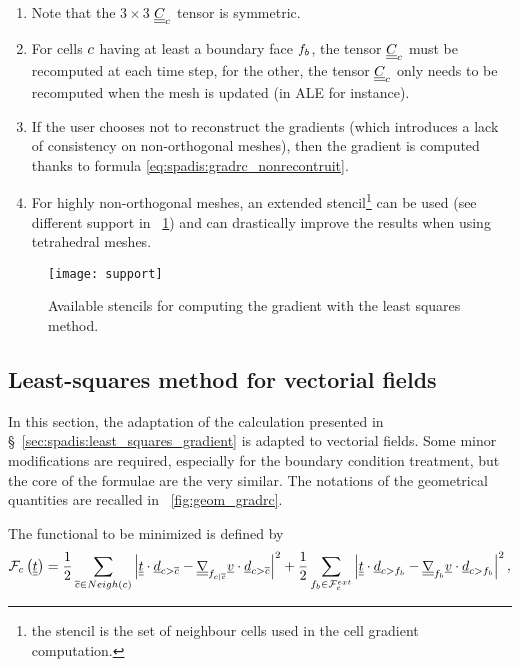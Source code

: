 \begin{remark}
\begin{enumerate}[ label=\roman{*}/, ref=(\roman{*})]
\item Note that the $3\times3$ $\underline{\underline{C}}_{c}$ tensor is symmetric.
\item For cells $c$ having at least a boundary face ${{f}_{b}}$, the tensor $\underline{\underline{C}}_{c}$ must be recomputed at each time step,
for the other, the tensor $\underline{\underline{C}}_{c}$ only needs to be recomputed when the mesh is updated (in ALE for instance).
\item If the user chooses not to reconstruct the gradients (which introduces a lack of consistency on non-orthogonal meshes),
then the gradient is computed thanks to formula \eqref{eq:spadis:gradrc_nonrecontruit}.
\item For highly non-orthogonal meshes, an extended stencil\footnote{
the stencil is the set of neighbour cells used in the cell gradient computation.
} can be used (see different support in \figurename~\ref{fig:spadis:gradmc_support}) and can drastically improve the results when using tetrahedral meshes.
\end{enumerate}
\end{remark}

\begin{figure}[!htp]
\centerline{\texttt{[image: support]}}
\caption{Available stencils for computing the gradient with the least squares method.\label{fig:spadis:gradmc_support}}
\end{figure}


\subsection{Least-squares method for vectorial fields}\label{sec:spadis:least_squares_gradient_vectors}
%
In this section, the adaptation of the calculation presented in \S~\ref{sec:spadis:least_squares_gradient} is adapted to
vectorial fields. Some minor modifications are required, especially for the boundary condition treatment, but the core of the
formulae are the very similar. The notations of the geometrical quantities are recalled in \figurename~\ref{fig:geom_gradrc}.

The functional to be minimized is defined by
%
\begin{equation}\label{eq:spadis:gradmv_function}
\mathcal{F}_c
\left( \underline{\underline{t}} \right) =
\dfrac{1}{2}\sum\limits_{{\overline{c}} \in Neigh\left(c\right)  }
\left| 
 \underline{\underline{t}}   \cdot \underline{d}_{{c > {\overline{c}}}}  -  \underline{\underline{{\nabla}}}_{{{f}_{c|{\overline{c}}}}} \underline{v}   \cdot \underline{d}_{{c > {\overline{c}}}}
 \right|^2+
\dfrac{1}{2}\sum\limits_{ {{f}_{b}} \in \mathcal{F}^{ext}_{c}}
\left| 
 \underline{\underline{t}}   \cdot \underline{d}_{c>{{f}_{b}}}  -  \underline{\underline{{\nabla}}}_{{{f}_{b}}} \underline{v}   \cdot \underline{d}_{c>{{f}_{b}}}
 \right|^2,
\end{equation}


